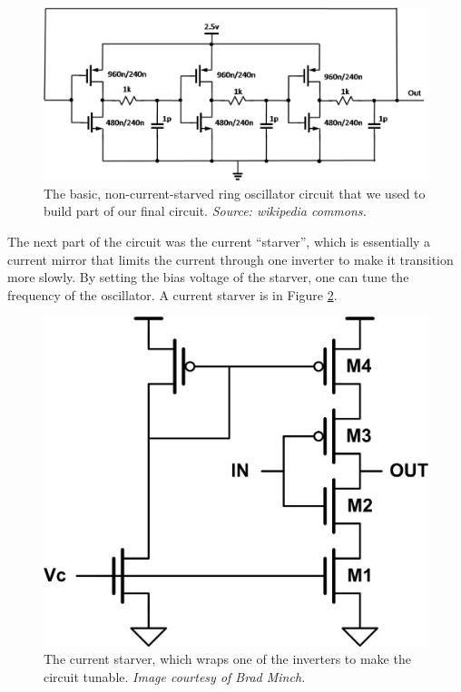 \documentclass{article}
\begin{document}
\begin{figure}[H]
\centering
\includegraphics[scale=.5]{ringOsc.png}
\caption{The basic, non-current-starved ring oscillator circuit that we used to build part of our final circuit.  \emph{Source: wikipedia commons.}}
\label{ring}
\end{figure}

The next part of the circuit was the current ``starver'', which is essentially a current mirror that limits the current through one inverter to make it transition more slowly. By setting the bias voltage of the starver, one can tune the frequency of the oscillator.  A current starver is in Figure \ref{starver}. 

\begin{figure}[H]
\centering
\includegraphics[scale=.5]{starver.jpg}
\caption{The current starver, which wraps one of the inverters to make the circuit tunable. \emph{Image courtesy of Brad Minch.}}
\label{starver}
\end{figure} 
\end{document}
